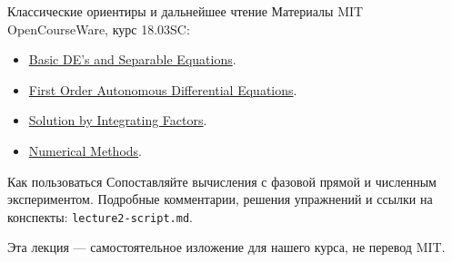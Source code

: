 \documentclass[aspectratio=169,11pt]{beamer}
\begin{document}
\begin{frame}{Классические ориентиры и дальнейшее чтение}
Материалы MIT OpenCourseWare, курс 18.03SC:
\begin{itemize}
\item \href{https://ocw.mit.edu/courses/18-03sc-differential-equations-fall-2011/pages/unit-i-first-order-differential-equations/basic-de-and-separable-equations/}{Basic DE's and Separable Equations}.
\item \href{https://ocw.mit.edu/courses/18-03sc-differential-equations-fall-2011/pages/unit-i-first-order-differential-equations/first-order-autonomous-differential-equations/}{First Order Autonomous Differential Equations}.
\item \href{https://ocw.mit.edu/courses/18-03sc-differential-equations-fall-2011/pages/unit-i-first-order-differential-equations/solution-by-integrating-factors/}{Solution by Integrating Factors}.
\item \href{https://ocw.mit.edu/courses/18-03sc-differential-equations-fall-2011/pages/unit-i-first-order-differential-equations/numerical-methods/}{Numerical Methods}.
\end{itemize}
\begin{block}{Как пользоваться}
Сопоставляйте вычисления с фазовой прямой и численным экспериментом.
Подробные комментарии, решения упражнений и ссылки на конспекты:
\texttt{lecture2-script.md}.
\end{block}
Эта лекция --- самостоятельное изложение для нашего курса, не перевод MIT.
\end{frame}
\end{document}
